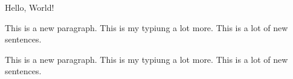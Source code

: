 \documentclass[12pt]{article}
\begin{document}
Hello, World!

This is a new paragraph. This is my typiung a lot more. This is a lot of new sentences.

This is a new paragraph. This is my typiung a lot more. This is a lot of new sentences.
\end{document}
